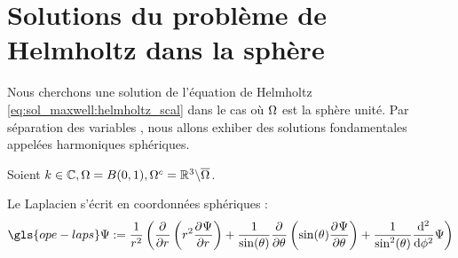 \section{Solutions du problème de Helmholtz dans la sphère}\label{sec:helmholtz_scal}

Nous cherchons une solution de l'équation de Helmholtz \eqref{eq:sol_maxwell:helmholtz_scal} dans le cas où $\Omega$ est la sphère unité. Par séparation des variables%
, nous allons exhiber des solutions fondamentales appelées harmoniques sphériques.

Soient $k \in \mathbb C, \Omega = B(0,1), \Omega^c = \mathbb R^3 \backslash \overline{\Omega}$. 

Le Laplacien s'écrit en coordonnées sphériques : 
\[ 
  \gls{ope-laps} \Psi := \frac{1}{r^2}\left(
  \ddr{r}{}\left(r^2\ddr{r}{\Psi}\right) 
  + \frac{1}{\sin(\theta)}\ddr{\theta}{}\left(\sin(\theta)\ddr{\theta}{\Psi}\right)
  + \frac{1}{\sin^2(\theta)} \frac{\dd^2}{\dd\phi^2} \Psi \right)
\]

